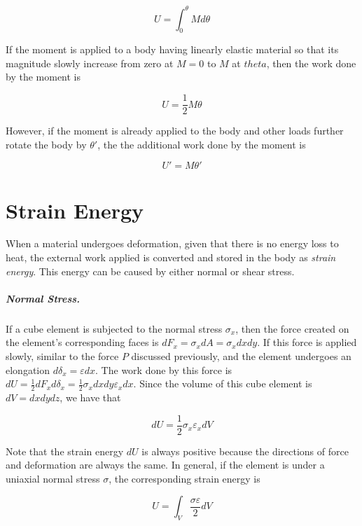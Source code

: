 \documentclass[
fontsize=10pt,
a4paper,
twosides=false,
open=any,
svgnames,
]{kaobook} %
\begin{document}
  \begin{equation}
  U = \int_0^\theta M d\theta
\end{equation}

If the moment is applied to a body having linearly elastic material so that its magnitude slowly increase from zero at $M = 0$ to $M$ at $theta$, then the work done by the moment is

\begin{equation}
  U = \frac{1}{2} M \theta
\end{equation}

However, if the moment is already applied to the body and other loads further rotate the body by $\theta'$, the the additional work done by the moment is

\begin{equation}
  U' = M \theta'
\end{equation}

\section{Strain Energy}

When a material undergoes deformation, given that there is no energy loss to heat, the external work applied is converted and stored in the body as \emph{strain energy}. This energy can be caused by either normal or shear stress.

\subparagraph{Normal Stress.}

If a cube element is subjected to the normal stress $\sigma_x$, then the force created on the element's corresponding faces is $dF_x = \sigma_x dA = \sigma_x dx dy$. If this force is applied slowly, similar to the force $P$ discussed previously, and the element undergoes an elongation $d\delta_x = \varepsilon dx$. The work done by this force is $dU = \frac{1}{2}dF_xd\delta_x = \frac{1}{2} \sigma_xdxdy\varepsilon_xdx$. Since the volume of this cube element is $dV = dxdydz$, we have that 

\begin{equation}
  dU = \frac{1}{2}\sigma_x \varepsilon_x dV
\end{equation}

Note that the strain energy $dU$ is always positive because the directions of force and deformation are always the same. In general, if the element is under a uniaxial normal stress $\sigma$, the corresponding strain energy is

\begin{equation}
  U = \int_V \frac{\sigma \varepsilon}{2} dV
\end{equation}
\end{document}

